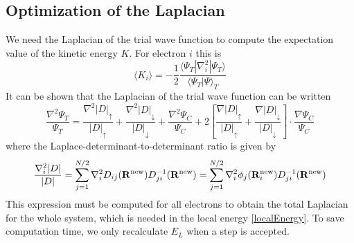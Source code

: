\documentclass[english, a4paper]{article}
\begin{document}
\subsection{Optimization of the Laplacian}
We need the Laplacian of the trial wave function to compute the expectation value of the kinetic
energy $K$. For electron $i$ this is
\begin{equation}
 \langle K_i \rangle = -\frac{1}{2} \frac{\langle\Psi_T|\nabla_i^2|\Psi_T\rangle}{\langle\Psi_T|\Psi\rangle_T}
 \label{kineticEnergy}
\end{equation}
It can be shown that the Laplacian of the trial wave function can be written
\begin{equation}
 \frac{\nabla^2\Psi_T}{\Psi_T} = \frac{\nabla^2|D|_\uparrow}{|D|_\uparrow} + 
 \frac{\nabla^2|D|_\downarrow}{|D|_\downarrow} + \frac{\nabla^2\Psi_C}{\Psi_C} + 
 2\left[\frac{\nabla|D|_\uparrow}{|D|_\uparrow} + \frac{\nabla|D|_\downarrow}{|D|_\downarrow}\right]
 \cdot \frac{\nabla \Psi_C}{\Psi_C}
\end{equation}
where the Laplace-determinant-to-determinant ratio is given by
\begin{equation}
 \frac{\nabla_i^2|D|}{|D|} = \sum_{j=1}^{N/2}\nabla_i^2D_{ij}({\bf R}^{\textrm{new}})D_{ji}^{-1}({\bf R}^{\textrm{new}})
 = \sum_{j=1}^{N/2}\nabla_i^2\phi_j({\bf R}_i^{\textrm{new}})D_{ji}^{-1}({\bf R}^{\textrm{new}})
\end{equation}
This expression must be computed for all electrons to obtain the total Laplacian for the whole system, which is needed
in the local energy \eqref{localEnergy}. To save computation time, we only recalculate $E_L$ when
a step is accepted. 
\end{document}
